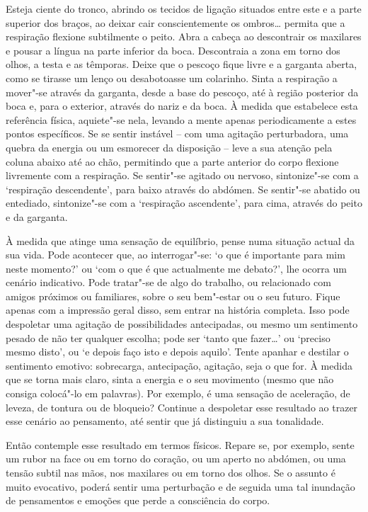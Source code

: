 Esteja ciente do tronco, abrindo os tecidos de ligação situados entre este e a
parte superior dos braços, ao deixar cair conscientemente os ombros\ldots{}
permita que a respiração flexione subtilmente o peito. Abra a cabeça ao
descontrair os maxilares e pousar a língua na parte inferior da boca.
Descontraia a zona em torno dos olhos, a testa e as têmporas. Deixe que o
pescoço fique livre e a garganta aberta, como se tirasse um lenço ou
desabotoasse um colarinho. Sinta a respiração a mover"-se através da garganta,
desde a base do pescoço, até à região posterior da boca e, para o exterior,
através do nariz e da boca. À medida que estabelece esta referência física,
aquiete"-se nela, levando a mente apenas periodicamente a estes pontos
\mbox{específicos}. Se se sentir instável -- com uma agitação perturbadora, uma quebra
da energia ou um esmorecer da disposição -- leve a sua atenção pela coluna
abaixo até ao chão, permitindo que a parte anterior do corpo flexione livremente
com a respiração. Se sentir"-se agitado ou nervoso, sintonize"-se com a
`respiração descendente', para baixo através do abdómen. Se sentir"-se abatido
ou entediado, sintonize"-se com a `respiração ascendente', para cima, através do
peito e da garganta.

À medida que atinge uma sensação de equilíbrio, pense numa situação actual da
sua vida. Pode acontecer que, ao interrogar"-se: `o que é importante para mim
neste momento?' ou `com o que é que actualmente me debato?', lhe ocorra um
cenário indicativo. Pode tratar"-se de algo do trabalho, ou relacionado com
amigos próximos ou familiares, sobre o seu bem"-estar ou o seu futuro. Fique
apenas com a impressão geral disso, sem entrar na história completa. Isso pode
despoletar uma agitação de possibilidades antecipadas, ou mesmo um sentimento
pesado de não ter qualquer escolha; pode ser `tanto que fazer\ldots{}' ou
`preciso mesmo disto', ou `e depois faço isto e depois aquilo'. Tente apanhar e
destilar o sentimento emotivo: sobrecarga, antecipação, agitação, seja o que
for. À medida que se torna mais claro, sinta a energia e o seu movimento (mesmo
que não consiga colocá"-lo em palavras). Por exemplo, é uma sensação de
aceleração, de leveza, de tontura ou de bloqueio? Continue a despoletar esse
resultado ao trazer esse cenário ao pensamento, até sentir que já distinguiu a
sua tonalidade.

Então contemple esse resultado em termos físicos. Repare se, por exemplo, sente
um rubor na face ou em torno do coração, ou um aperto no abdómen, ou uma tensão
subtil nas mãos, nos maxilares ou em torno dos olhos. Se o assunto é muito
evocativo, poderá sentir uma perturbação e de seguida uma tal inundação de
pensamentos e emoções que perde a consciência do corpo.

